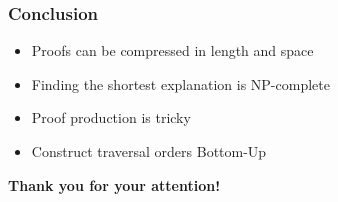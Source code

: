 \documentclass{beamer}
\begin{document}
\begin{frame}

\frametitle{Conclusion}

\begin{itemize}
	\item Proofs can be compressed in length and space
	\item Finding the shortest explanation is NP-complete
	\item Proof production is tricky
	\item Construct traversal orders Bottom-Up
\end{itemize}

\end{frame}

\begin{frame}

\centering \textbf{\LARGE{Thank you for your attention!}}

\end{frame}
\end{document}

